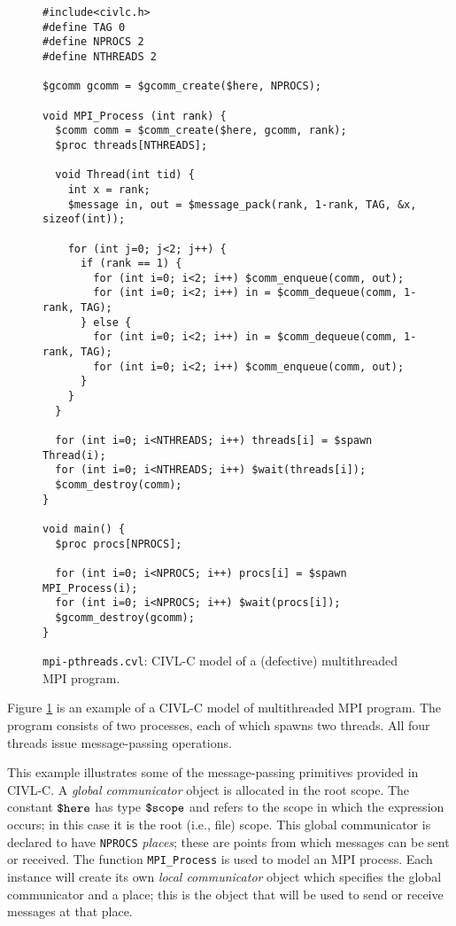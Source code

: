 \begin{figure}[t]
  \begin{small}
\begin{verbatim}
#include<civlc.h>
#define TAG 0
#define NPROCS 2
#define NTHREADS 2

$gcomm gcomm = $gcomm_create($here, NPROCS);

void MPI_Process (int rank) {
  $comm comm = $comm_create($here, gcomm, rank);
  $proc threads[NTHREADS];
  
  void Thread(int tid) {
    int x = rank;
    $message in, out = $message_pack(rank, 1-rank, TAG, &x, sizeof(int));
    
    for (int j=0; j<2; j++) {
      if (rank == 1) {
        for (int i=0; i<2; i++) $comm_enqueue(comm, out);
        for (int i=0; i<2; i++) in = $comm_dequeue(comm, 1-rank, TAG);
      } else {
        for (int i=0; i<2; i++) in = $comm_dequeue(comm, 1-rank, TAG);
        for (int i=0; i<2; i++) $comm_enqueue(comm, out);
      }
    }
  }
  
  for (int i=0; i<NTHREADS; i++) threads[i] = $spawn Thread(i);
  for (int i=0; i<NTHREADS; i++) $wait(threads[i]);
  $comm_destroy(comm);
}

void main() {
  $proc procs[NPROCS];

  for (int i=0; i<NPROCS; i++) procs[i] = $spawn MPI_Process(i);
  for (int i=0; i<NPROCS; i++) $wait(procs[i]);
  $gcomm_destroy(gcomm);
}
\end{verbatim}
  \end{small}
  \caption{\texttt{mpi-pthreads.cvl}: CIVL-C model of a (defective)
    multithreaded MPI program.}
  \label{fig:mpithreads}
\end{figure}

Figure \ref{fig:mpithreads} is an example of a CIVL-C model of
multithreaded MPI program.  The program consists of two processes,
each of which spawns two threads.  All four threads issue
message-passing operations.

This example illustrates some of the message-passing primitives
provided in CIVL-C.  A \emph{global communicator} object is allocated
in the root scope.  The constant $\mbox{\texttt{\${}here}}$ has type $\mbox{\texttt{\${}scope}}$ and
refers to the scope in which the expression occurs; in this case it is
the root (i.e., file) scope.  This global communicator is declared to
have \texttt{NPROCS} \emph{places}; these are points from which
messages can be sent or received.  The function \verb!MPI_Process!  is
used to model an MPI process.  Each instance will create its own
\emph{local communicator} object which specifies the global
communicator and a place; this is the object that will be used to send
or receive messages at that place.

